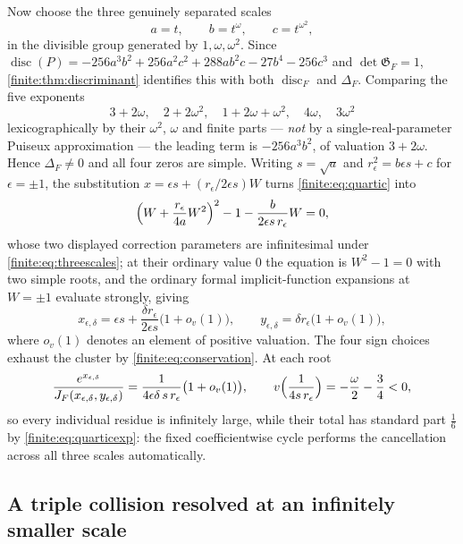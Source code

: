 \documentclass[11pt,letterpaper]{article}
\theoremstyle{definition}
\theoremstyle{remark}
\newcommand{\Gram}{\mathfrak G}
\DeclareMathOperator{\disc}{disc}
\numberwithin{equation}{section}
\begin{document}
Now choose the three genuinely separated scales
\begin{equation}\label{finite:eq:threescales}
 a=t,\qquad b=t^\omega,\qquad c=t^{\omega^2},
\end{equation}
in the divisible group generated by $1,\omega,\omega^2$. Since $\disc(P)=-256a^3b^2+256a^2c^2+288ab^2c-27b^4-256c^3$ and $\det\Gram_F=1$, \cref{finite:thm:discriminant} identifies this with both $\disc_F$ and $\Delta_F$. Comparing the five exponents
\[
 3+2\omega,\quad 2+2\omega^2,\quad 1+2\omega+\omega^2,\quad 4\omega,\quad 3\omega^2
\]
lexicographically by their $\omega^2$, $\omega$ and finite parts --- \emph{not} by a single-real-parameter Puiseux approximation --- the leading term is $-256a^3b^2$, of valuation $3+2\omega$. Hence $\Delta_F\neq0$ and all four zeros are simple. Writing $s=\sqrt a$ and $r_\epsilon^2=b\epsilon s+c$ for $\epsilon=\pm1$, the substitution $x=\epsilon s+(r_\epsilon/2\epsilon s)W$ turns \eqref{finite:eq:quartic} into
\[
 \Bigl(W+\frac{r_\epsilon}{4a}W^2\Bigr)^2-1-\frac b{2\epsilon s\,r_\epsilon}W=0,
\]
whose two displayed correction parameters are infinitesimal under \eqref{finite:eq:threescales}; at their ordinary value $0$ the equation is $W^2-1=0$ with two simple roots, and the ordinary formal implicit-function expansions at $W=\pm1$ evaluate strongly, giving
\begin{equation}\label{finite:eq:quarticrootleading}
 x_{\epsilon,\delta}=\epsilon s+\frac{\delta r_\epsilon}{2\epsilon s}\bigl(1+o_v(1)\bigr),
 \qquad
 y_{\epsilon,\delta}=\delta r_\epsilon\bigl(1+o_v(1)\bigr),
\end{equation}
where $o_v(1)$ denotes an element of positive valuation. The four sign choices exhaust the cluster by \eqref{finite:eq:conservation}. At each root
\[
 \frac{e^{x_{\epsilon,\delta}}}{J_F(x_{\epsilon,\delta},y_{\epsilon,\delta})}
 =\frac1{4\epsilon\delta\,s\,r_\epsilon}\bigl(1+o_v(1)\bigr),
 \qquad
 v\Bigl(\frac1{4s\,r_\epsilon}\Bigr)=-\frac\omega2-\frac34<0,
\]
so every individual residue is infinitely large, while their total has standard part $\tfrac16$ by \eqref{finite:eq:quarticexp}: the fixed coefficientwise cycle performs the cancellation across all three scales automatically.

\subsection{A triple collision resolved at an infinitely smaller scale}
\label{finite:sec:triple}
\end{document}
